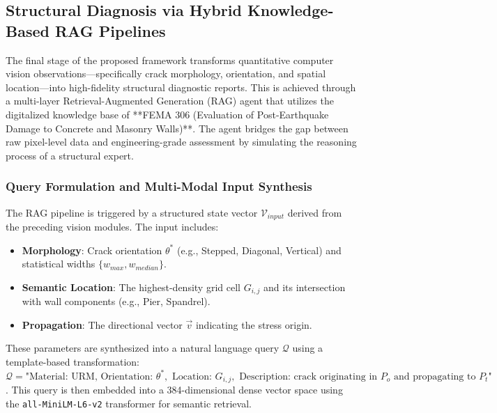 \subsection{Structural Diagnosis via Hybrid Knowledge-Based RAG Pipelines}
\label{sec:rag_diagnosis}

\begin{sloppypar}
The final stage of the proposed framework transforms quantitative computer vision observations—specifically crack morphology, orientation, and spatial location—into high-fidelity structural diagnostic reports. This is achieved through a multi-layer Retrieval-Augmented Generation (RAG) agent that utilizes the digitalized knowledge base of **FEMA 306 (Evaluation of Post-Earthquake Damage to Concrete and Masonry Walls)**. The agent bridges the gap between raw pixel-level data and engineering-grade assessment by simulating the reasoning process of a structural expert.
\end{sloppypar}

\subsubsection{Query Formulation and Multi-Modal Input Synthesis}
\begin{sloppypar}
The RAG pipeline is triggered by a structured state vector $\mathcal{V}_{input}$ derived from the preceding vision modules. The input includes:
\end{sloppypar}

\begin{itemize}[noitemsep,leftmargin=1.5em]
    \item \textbf{Morphology}: Crack orientation $\theta^*$ (e.g., Stepped, Diagonal, Vertical) and statistical widths $\{w_{max}, w_{median}\}$.
    \item \textbf{Semantic Location}: The highest-density grid cell $G_{i,j}$ and its intersection with wall components (e.g., Pier, Spandrel).
    \item \textbf{Propagation}: The directional vector $\vec{v}$ indicating the stress origin.
\end{itemize}

\begin{sloppypar}
These parameters are synthesized into a natural language query $\mathcal{Q}$ using a template-based transformation: 
$\mathcal{Q} = \text{"Material: URM, Orientation: } \theta^*, \text{ Location: } G_{i,j}, \text{ Description: crack originating in } P_o \text{ and propagating to } P_t\text{"}$. This query is then embedded into a 384-dimensional dense vector space using the \texttt{all-MiniLM-L6-v2} transformer for semantic retrieval.
\end{sloppypar}

